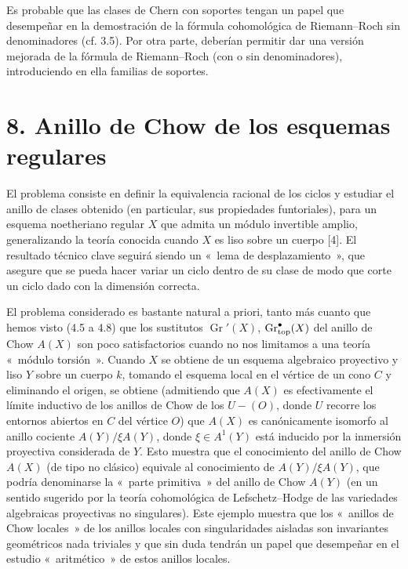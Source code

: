 Es probable que las clases de Chern con soportes tengan un papel que
desempeñar en la demostración de la fórmula cohomológica de Riemann--Roch sin
denominadores (cf. 3.5). Por otra parte, deberían permitir dar una versión
mejorada de la fórmula de Riemann--Roch (con o sin denominadores),
introduciendo en ella familias de soportes.

\section*{8. Anillo de Chow de los esquemas regulares}

El problema consiste en definir la equivalencia racional de los ciclos y
estudiar el anillo de clases obtenido (en particular, sus propiedades
funtoriales), para un esquema noetheriano regular $X$ que admita un módulo
invertible amplio, generalizando la teoría conocida cuando $X$ es liso sobre
un cuerpo [4]. El resultado técnico clave seguirá siendo un «~lema de
desplazamiento~», que asegure que se pueda hacer variar un ciclo dentro de
su clase de modo que corte un ciclo dado con la dimensión correcta.

El problema considerado es bastante natural a priori, tanto más cuanto que
hemos visto (4.5 a 4.8) que los sustitutos $\operatorname{Gr}'(X)$,
$\operatorname{Gr}_{\mathrm{top}}^\bullet(X)$ del anillo de Chow $A(X)$ son poco satisfactorios cuando
no nos limitamos a una teoría «~módulo torsión~». Cuando $X$ se obtiene de
un esquema algebraico proyectivo y liso $Y$ sobre un cuerpo $k$, tomando el
esquema local en el vértice de un cono  $C$ y eliminando el %
origen, se obtiene (admitiendo que $A(X)$ es efectivamente el límite
inductivo de los anillos de Chow de los $U-(O)$, donde $U$ recorre los
entornos abiertos en $C$ del vértice $O$) que $A(X)$ es canónicamente
isomorfo al anillo cociente $A(Y)/\xi A(Y)$, donde $\xi\in A^1(Y)$ está
inducido por la inmersión proyectiva considerada de $Y$. Esto muestra que el
conocimiento del anillo de Chow $A(X)$ (de tipo no clásico) equivale al
conocimiento de $A(Y)/\xi A(Y)$, que podría denominarse la «~parte
primitiva~» del anillo de Chow $A(Y)$ (en un sentido sugerido por la teoría
cohomológica de Lefschetz--Hodge de las variedades algebraicas proyectivas
no singulares). Este ejemplo muestra que los «~anillos de Chow locales~» de
los anillos locales con singularidades aisladas son invariantes geométricos
nada triviales y que sin duda tendrán un papel que desempeñar en el estudio
«~aritmético~» de estos anillos locales.

